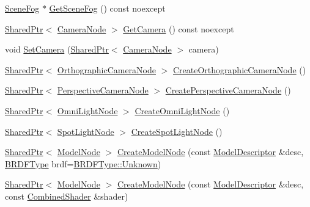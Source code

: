 \begin{DoxyCompactItemize}
\hyperlink{structmage_1_1_scene_fog}{Scene\+Fog} $\ast$ \hyperlink{classmage_1_1_scene_a1f21d92feb659477ceb4642322fa2f0c}{Get\+Scene\+Fog} () const noexcept
\item 
\hyperlink{namespacemage_a1e01ae66713838a7a67d30e44c67703e}{Shared\+Ptr}$<$ \hyperlink{classmage_1_1_camera_node}{Camera\+Node} $>$ \hyperlink{classmage_1_1_scene_ad77fe833ca79bf862e1929dfdeb0f1fd}{Get\+Camera} () const noexcept
\item 
void \hyperlink{classmage_1_1_scene_a7568ec0884d04812af2f70990c8ec80d}{Set\+Camera} (\hyperlink{namespacemage_a1e01ae66713838a7a67d30e44c67703e}{Shared\+Ptr}$<$ \hyperlink{classmage_1_1_camera_node}{Camera\+Node} $>$ camera)
\item 
\hyperlink{namespacemage_a1e01ae66713838a7a67d30e44c67703e}{Shared\+Ptr}$<$ \hyperlink{namespacemage_a7d62ab5877be3e14a9735014b77d3f55}{Orthographic\+Camera\+Node} $>$ \hyperlink{classmage_1_1_scene_a9ed9e3a611434f62427c7bd4c16d2456}{Create\+Orthographic\+Camera\+Node} ()
\item 
\hyperlink{namespacemage_a1e01ae66713838a7a67d30e44c67703e}{Shared\+Ptr}$<$ \hyperlink{namespacemage_ad6f2ef4a25873e73e8fa38b06425939f}{Perspective\+Camera\+Node} $>$ \hyperlink{classmage_1_1_scene_a3f4141d407133e6419af92376bc3ecc1}{Create\+Perspective\+Camera\+Node} ()
\item 
\hyperlink{namespacemage_a1e01ae66713838a7a67d30e44c67703e}{Shared\+Ptr}$<$ \hyperlink{namespacemage_a1724c6e6b6b5ba535cdd967cbbb4a669}{Omni\+Light\+Node} $>$ \hyperlink{classmage_1_1_scene_a370f5ce63a6277a1369c1545f0acbffa}{Create\+Omni\+Light\+Node} ()
\item 
\hyperlink{namespacemage_a1e01ae66713838a7a67d30e44c67703e}{Shared\+Ptr}$<$ \hyperlink{namespacemage_aeed5dee4ff6c591eabb0e9114256df4a}{Spot\+Light\+Node} $>$ \hyperlink{classmage_1_1_scene_a27ffb510eeb8e208ba20ee0d76138a3f}{Create\+Spot\+Light\+Node} ()
\item 
\hyperlink{namespacemage_a1e01ae66713838a7a67d30e44c67703e}{Shared\+Ptr}$<$ \hyperlink{classmage_1_1_model_node}{Model\+Node} $>$ \hyperlink{classmage_1_1_scene_a5928fe1e71e816f6b13d055ee5dfa239}{Create\+Model\+Node} (const \hyperlink{classmage_1_1_model_descriptor}{Model\+Descriptor} \&desc, \hyperlink{namespacemage_ae7a7a03a7b34d7e2689689bb8295cd38}{B\+R\+D\+F\+Type} brdf=\hyperlink{namespacemage_ae7a7a03a7b34d7e2689689bb8295cd38a88183b946cc5f0e8c96b2e66e1c74a7e}{B\+R\+D\+F\+Type\+::\+Unknown})
\item 
\hyperlink{namespacemage_a1e01ae66713838a7a67d30e44c67703e}{Shared\+Ptr}$<$ \hyperlink{classmage_1_1_model_node}{Model\+Node} $>$ \hyperlink{classmage_1_1_scene_ae21a831a792ab16b1459cfa8b65a2508}{Create\+Model\+Node} (const \hyperlink{classmage_1_1_model_descriptor}{Model\+Descriptor} \&desc, const \hyperlink{structmage_1_1_combined_shader}{Combined\+Shader} \&shader)

\end{DoxyCompactItemize}
